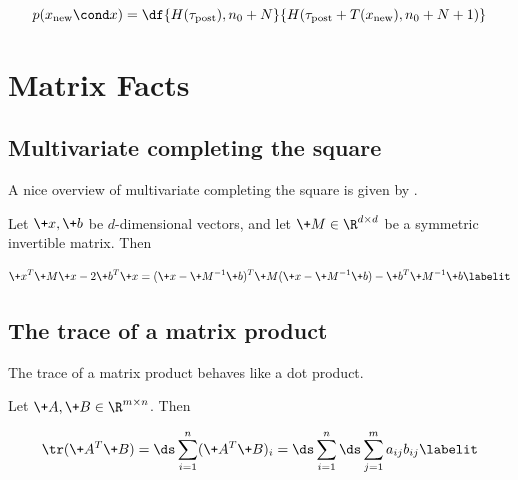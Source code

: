 \documentclass{article} %
\begin{document}
\begin{equation}
p(x_{\text{new}} \cond x) = \df{H(\tau_{\text{post}}), n_0 + N}{H(\tau_{\text{post}} + T(x_{\text{new}}), n_0 + N + 1)}
\label{eqn:predictive_posterior_exptl_family}
\end{equation}




\newpage 
 \appendix
 

\section{Matrix Facts}

\subsection{Multivariate completing the square}

A nice overview of multivariate completing the square is given by \cite{gundersenXXXXcompleting}.    

Let $\+x,  \+b$ be $d$-dimensional vectors, and let $\+M \in \R^{d \times d}$ be a symmetric invertible matrix. Then

\begin{align*}
\+x^T \+M \+x - 2 \+b^T \+x = (\+x - \+M^{-1} \+b)^T \+M (\+x - \+M^{-1} \+b) - \+b^T \+M^{-1} \+b
 \labelit \label{eqn:multivariate_completing_the_square}
\end{align*}

% 

\subsection{The trace of a matrix product}

The trace of a matrix product behaves like a dot product.  

Let $\+A, \+B \in \R^{m \times n}$.  Then 

\begin{align*}
\tr (\+A^T \+B) = \ds\sum_{i=1}^n (\+A^T \+B)_i = \ds\sum_{i=1}^n \ds\sum_{j=1}^m a_{ij} b_{ij}
\labelit \label{eqn:trace_of_matrix_product}
\end{align*}
\end{document}
